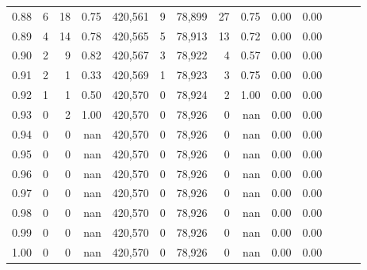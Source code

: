 \begin{tabular}{rrrrrrrrrrrrrr}
0.88 &       6 &     18 &  0.75 &  420,561 &        9 &  78,899 &      27 &  0.75 &  0.00 &      0.00 \\
0.89 &       4 &     14 &  0.78 &  420,565 &        5 &  78,913 &      13 &  0.72 &  0.00 &      0.00 \\
0.90 &       2 &      9 &  0.82 &  420,567 &        3 &  78,922 &       4 &  0.57 &  0.00 &      0.00 \\
0.91 &       2 &      1 &  0.33 &  420,569 &        1 &  78,923 &       3 &  0.75 &  0.00 &      0.00 \\
0.92 &       1 &      1 &  0.50 &  420,570 &        0 &  78,924 &       2 &  1.00 &  0.00 &      0.00 \\
0.93 &       0 &      2 &  1.00 &  420,570 &        0 &  78,926 &       0 &   nan &  0.00 &      0.00 \\
0.94 &       0 &      0 &   nan &  420,570 &        0 &  78,926 &       0 &   nan &  0.00 &      0.00 \\
0.95 &       0 &      0 &   nan &  420,570 &        0 &  78,926 &       0 &   nan &  0.00 &      0.00 \\
0.96 &       0 &      0 &   nan &  420,570 &        0 &  78,926 &       0 &   nan &  0.00 &      0.00 \\
0.97 &       0 &      0 &   nan &  420,570 &        0 &  78,926 &       0 &   nan &  0.00 &      0.00 \\
0.98 &       0 &      0 &   nan &  420,570 &        0 &  78,926 &       0 &   nan &  0.00 &      0.00 \\
0.99 &       0 &      0 &   nan &  420,570 &        0 &  78,926 &       0 &   nan &  0.00 &      0.00 \\
1.00 &       0 &      0 &   nan &  420,570 &        0 &  78,926 &       0 &   nan &  0.00 &      0.00 \\
\bottomrule
\end{tabular}
